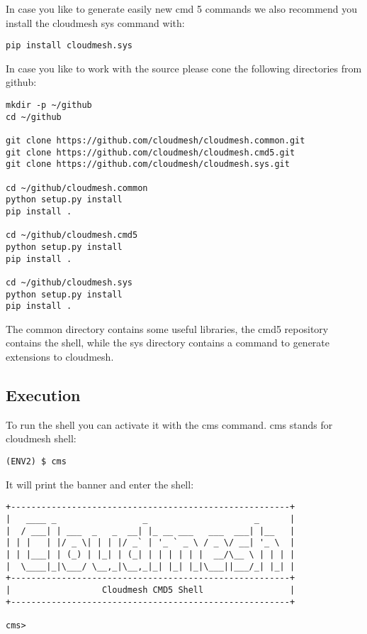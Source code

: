 In case you like to generate easily new cmd 5 commands we also recommend
you install the cloudmesh sys command with:

\begin{verbatim}
pip install cloudmesh.sys
\end{verbatim}

In case you like to work with the source please cone the following
directories from github:

\begin{verbatim}
mkdir -p ~/github
cd ~/github

git clone https://github.com/cloudmesh/cloudmesh.common.git
git clone https://github.com/cloudmesh/cloudmesh.cmd5.git
git clone https://github.com/cloudmesh/cloudmesh.sys.git  

cd ~/github/cloudmesh.common
python setup.py install
pip install .

cd ~/github/cloudmesh.cmd5
python setup.py install
pip install .

cd ~/github/cloudmesh.sys
python setup.py install
pip install .
\end{verbatim}

The common directory contains some useful libraries, the cmd5 repository
contains the shell, while the sys directory contains a command to
generate extensions to cloudmesh.

\subsection{Execution}\label{execution}

To run the shell you can activate it with the cms command. cms stands
for cloudmesh shell:

\begin{verbatim}
(ENV2) $ cms
\end{verbatim}

It will print the banner and enter the shell:

\begin{verbatim}
+-------------------------------------------------------+
|   ____ _                 _                     _      |
|  / ___| | ___  _   _  __| |_ __ ___   ___  ___| |__   |
| | |   | |/ _ \| | | |/ _` | '_ ` _ \ / _ \/ __| '_ \  |
| | |___| | (_) | |_| | (_| | | | | | |  __/\__ \ | | | |
|  \____|_|\___/ \__,_|\__,_|_| |_| |_|\___||___/_| |_| |
+-------------------------------------------------------+
|                  Cloudmesh CMD5 Shell                 |
+-------------------------------------------------------+

cms>
\end{verbatim}

